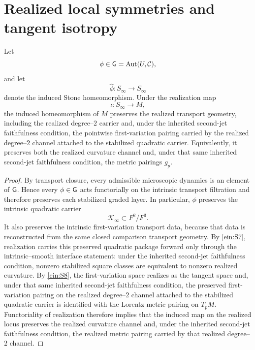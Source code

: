 \section{Realized local symmetries and tangent isotropy}
\label{sec:einstein-rigidity}
\begin{lemma}
	\label{lem:einstein-realized-preservation}
	Let
	\[
		\phi\in\mathsf G=\operatorname{Aut}(U,\mathcal C),
	\]
	and let
	\[
		\widehat\phi:S_\infty\to S_\infty
	\]
	denote the induced Stone homeomorphism.
	Under the realization map
	\[
		\iota:S_\infty\to M,
	\]
	the induced homeomorphism of \(M\) preserves the realized transport
	geometry, including the realized degree--\(2\) carrier and, under the
	inherited second-jet faithfulness condition, the pointwise
	first-variation pairing carried by the realized degree--\(2\)
	channel attached to the stabilized quadratic carrier.
	Equivalently, it preserves both the realized curvature channel and,
	under that same inherited second-jet faithfulness condition, the metric
	pairings \(g_p\).
\end{lemma}
\begin{proof}
	By transport closure, every admissible microscopic dynamics is an
	element of \(\mathsf G\).
	Hence every \(\phi\in\mathsf G\) acts functorially on the intrinsic transport
	filtration and therefore preserves each stabilized graded layer.
	In particular, \(\phi\) preserves the intrinsic quadratic carrier
	\[
		\mathcal K_\infty\subset F^2/F^3.
	\]
	It also preserves the intrinsic first-variation transport data, because
	that data is reconstructed from the same closed comparison transport
	geometry.
	By \ref{ein:S7}, realization carries this preserved quadratic package
	forward only through the intrinsic--smooth interface statement: under the
	inherited second-jet faithfulness condition, nonzero stabilized square
	classes are equivalent to nonzero realized curvature.
	By \ref{ein:S8}, the first-variation space realizes as the tangent
	space and, under that same inherited second-jet faithfulness condition,
	the preserved first-variation pairing on the realized degree--\(2\)
	channel attached to the stabilized quadratic carrier is identified
	with the Lorentz metric pairing on \(T_pM\).
	Functoriality of realization therefore implies that the induced map on
	the realized locus preserves the realized curvature channel and, under
	the inherited second-jet faithfulness condition, the realized metric
	pairing carried by that realized degree--\(2\) channel.
\end{proof}
